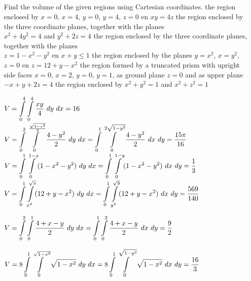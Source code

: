 \subsection*{}    
\begin{Exercise} Find the volume of the given regions  using Cartesian coordinates.
        \Question[difficulty = 1] the region enclosed by $x=0$, $x=4$, $y=0$, $y=4$, $z=0$ en $xy=4z$
        \Question[difficulty = 2] the region enclosed by the three coordinate planes, together with the planes \\ $x^2+4y^2=4$ and $y^2+2z=4$
        \Question[difficulty = 3] the region enclosed by the three coordinate planes, together with the planes \\ $z=1-x^2-y^2$ en $x+y \leq 1$
        \Question[difficulty = 3] the region enclosed by the planes $y=x^2$, $x=y^2$, $z=0$ en $z=12 + y - x^2$
        \Question[difficulty = 3] the region formed by a truncated prism with upright side faces $x=0$, $x=2$, $y=0$, $y=1$, as ground plane $z=0$ and as upper plane $-x+y+2z=4$ 
        \Question[difficulty = 2] the region enclosed by $x^2+y^2=1$ and $x^2+z^2=1$ 
\end{Exercise}

\begin{Answer}
    
        \Question $V = \displaystyle \int\limits_0^4 \displaystyle \int\limits_0^{4} \dfrac{xy}{4} \ dy \ dx = 16$
       \Question $V = \ds \int\limits_0^2 \ds \int\limits_0^{\frac{\sqrt{4-x^2}}{2}} \dfrac{4-y^2}{2} \ dy \ dx   = \ds \int\limits_0^1 \ds \int\limits_0^{2\sqrt{1-y^2}} \dfrac{4-y^2}{2} \ dx\ dy = \dfrac{15 \pi}{16}$
        \Question $V =\displaystyle \int\limits_0^1 \displaystyle \int\limits_0^{1-x} (1-x^2-y^2) \ dy \ dx= \displaystyle \int\limits_0^1 \displaystyle \int\limits_0^{1-y} (1-x^2-y^2) \ dx \ dy = \dfrac{1}{3}$
        \Question $V = \displaystyle \int\limits_0^1 \displaystyle \int\limits_{x^2}^{\sqrt{x}} (12+y-x^2) \ dy \ dx=  \displaystyle \int\limits_0^1\displaystyle \int\limits_{y^2}^{\sqrt{y}} (12+y-x^2) \ dx \ dy = \dfrac{569}{140}$
  
        \Question $V = \displaystyle \int\limits_0^2 \displaystyle \int\limits_{0}^{1} \dfrac{4+x-y}{2} \ dy\  dx=  \displaystyle \int\limits_0^1\displaystyle \int\limits_{0}^{2} \dfrac{4+x-y}{2}  \ dx\  dy = \dfrac{9}{2} $
        
        \Question $V = 8 \ds \int\limits_0^1 \ds \int\limits_{0}^{\sqrt{1-x^2}} \sqrt{1-x^2} \ dy\  dx = 8 \ds \int\limits_0^1\ds \int\limits_{0}^{\sqrt{1-y^2}} \sqrt{1-x^2}  \ dx\  dy = \dfrac{16}{3} $
         
    
\end{Answer}   

